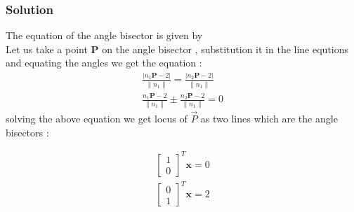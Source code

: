 \documentclass{beamer}
\begin{document}
\begin{frame}
\frametitle{Solution}
The equation of the angle bisector is given by \\
Let us take a point \textbf{P} on the angle bisector , substitution it in the line equtions and equating the angles we get the equation :
\begin{align}
  \frac{\lvert n_1\textbf{P} - 2 \rvert}{\lVert n_1\rVert}  =  \frac{\lvert n_2\textbf{P} - 2 \rvert}{\lVert n_1\rVert} \\
  \frac{n_1\textbf{P} - 2}{\lVert n_1\rVert} \pm \frac{ n_2\textbf{P} - 2}{\lVert n_1\rVert} = 0
\end{align}
solving the above equation we get locus of $\vec{P}$ as two lines which are the angle bisectors :

\begin{align}
    \begin{bmatrix}1\\0\end{bmatrix}^{T}\textbf{x} = 0\\
     \begin{bmatrix}0\\1\end{bmatrix}^{T}\textbf{x} = 2
\end{align}

\end{frame}
\end{document}
